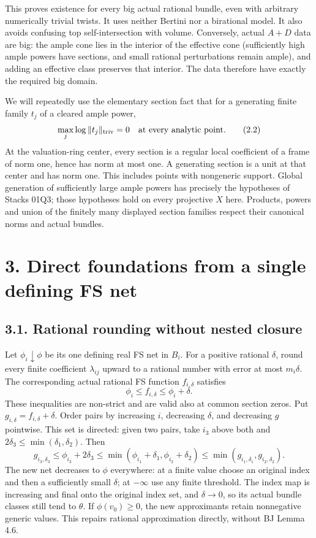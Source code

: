 \documentclass[
  10pt,
]{article}
\begin{document}
This proves existence for every big actual rational bundle, even with
arbitrary numerically trivial twists. It uses neither Bertini nor a
birational model. It also avoids confusing top self-intersection with
volume. Conversely, actual \(A+D\) data are big: the ample cone lies in
the interior of the effective cone (sufficiently high ample powers have
sections, and small rational perturbations remain ample), and adding an
effective class preserves that interior. The data therefore have exactly
the required big domain.

We will repeatedly use the elementary section fact that for a generating
finite family \(t_j\) of a cleared ample power,
\[\max_j\log\|t_j\|_{\rm triv}=0\quad\text{at every analytic point}.\tag{2.2}\]
At the valuation-ring center, every section is a regular local
coefficient of a frame of norm one, hence has norm at most one. A
generating section is a unit at that center and has norm one. This
includes points with nongeneric support. Global generation of
sufficiently large ample powers has precisely the hypotheses of Stacks
01Q3; those hypotheses hold on every projective \(X\) here. Products,
powers and union of the finitely many displayed section families respect
their canonical norms and actual bundles.

\section{3. Direct foundations from a single defining FS
net}\label{direct-foundations-from-a-single-defining-fs-net}

\subsection{3.1. Rational rounding without nested
closure}\label{rational-rounding-without-nested-closure}

Let \(\phi_i\downarrow\phi\) be its one defining real FS net in \(B_i\).
For a positive rational \(\delta\), round every finite coefficient
\(\lambda_{ij}\) upward to a rational number with error at most
\(m_i\delta\). The corresponding actual rational FS function
\(f_{i,\delta}\) satisfies
\[\phi_i\leq f_{i,\delta}\leq\phi_i+\delta.\tag{3.1}\] These
inequalities are non-strict and are valid also at common section zeros.
Put \(g_{i,\delta}=f_{i,\delta}+\delta\). Order pairs by increasing
\(i\), decreasing \(\delta\), and decreasing \(g\) pointwise. This set
is directed: given two pairs, take \(i_3\) above both and
\(2\delta_3\leq\min(\delta_1,\delta_2)\). Then
\[g_{i_3,\delta_3}\leq\phi_{i_3}+2\delta_3
\leq\min(\phi_{i_1}+\delta_1,\phi_{i_2}+\delta_2)
\leq\min(g_{i_1,\delta_1},g_{i_2,\delta_2}).\tag{3.2}\] The new net
decreases to \(\phi\) everywhere: at a finite value choose an original
index and then a sufficiently small \(\delta\); at \(-\infty\) use any
finite threshold. The index map is increasing and final onto the
original index set, and \(\delta\to0\), so its actual bundle classes
still tend to \(\theta\). If \(\phi(v_0)\geq0\), the new approximants
retain nonnegative generic values. This repairs rational approximation
directly, without BJ Lemma 4.6.
\end{document}
